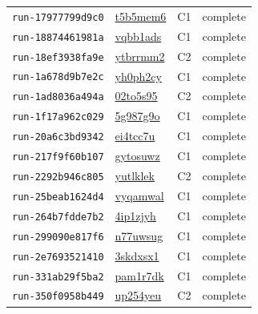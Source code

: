 \begin{longtable}{llll}
\texttt{run-17977799d9c0} & \href{https://forge.coreweave.com/wandb/lbxa-corp/collusion-benchmark/runs/t5b5mem6}{t5b5mem6} & C1 & complete \\
\texttt{run-18874461981a} & \href{https://forge.coreweave.com/wandb/lbxa-corp/collusion-benchmark/runs/vqbb1ads}{vqbb1ads} & C1 & complete \\
\texttt{run-18ef3938fa9e} & \href{https://forge.coreweave.com/wandb/lbxa-corp/collusion-benchmark/runs/ytbrrmm2}{ytbrrmm2} & C2 & complete \\
\texttt{run-1a678d9b7e2c} & \href{https://forge.coreweave.com/wandb/lbxa-corp/collusion-benchmark/runs/yh0ph2cy}{yh0ph2cy} & C1 & complete \\
\texttt{run-1ad8036a494a} & \href{https://forge.coreweave.com/wandb/lbxa-corp/collusion-benchmark/runs/02to5s95}{02to5s95} & C2 & complete \\
\texttt{run-1f17a962c029} & \href{https://forge.coreweave.com/wandb/lbxa-corp/collusion-benchmark/runs/5g987g9o}{5g987g9o} & C1 & complete \\
\texttt{run-20a6c3bd9342} & \href{https://forge.coreweave.com/wandb/lbxa-corp/collusion-benchmark/runs/ei4tcc7u}{ei4tcc7u} & C1 & complete \\
\texttt{run-217f9f60b107} & \href{https://forge.coreweave.com/wandb/lbxa-corp/collusion-benchmark/runs/gytosuwz}{gytosuwz} & C1 & complete \\
\texttt{run-2292b946c805} & \href{https://forge.coreweave.com/wandb/lbxa-corp/collusion-benchmark/runs/yutlklek}{yutlklek} & C2 & complete \\
\texttt{run-25beab1624d4} & \href{https://forge.coreweave.com/wandb/lbxa-corp/collusion-benchmark/runs/vyqamwal}{vyqamwal} & C1 & complete \\
\texttt{run-264b7fdde7b2} & \href{https://forge.coreweave.com/wandb/lbxa-corp/collusion-benchmark/runs/4ip1zjyh}{4ip1zjyh} & C1 & complete \\
\texttt{run-299090e817f6} & \href{https://forge.coreweave.com/wandb/lbxa-corp/collusion-benchmark/runs/n77uwsug}{n77uwsug} & C1 & complete \\
\texttt{run-2e7693521410} & \href{https://forge.coreweave.com/wandb/lbxa-corp/collusion-benchmark/runs/3skdxsx1}{3skdxsx1} & C1 & complete \\
\texttt{run-331ab29f5ba2} & \href{https://forge.coreweave.com/wandb/lbxa-corp/collusion-benchmark/runs/pam1r7dk}{pam1r7dk} & C1 & complete \\
\texttt{run-350f0958b449} & \href{https://forge.coreweave.com/wandb/lbxa-corp/collusion-benchmark/runs/up254yeu}{up254yeu} & C2 & complete \\

\end{longtable}
